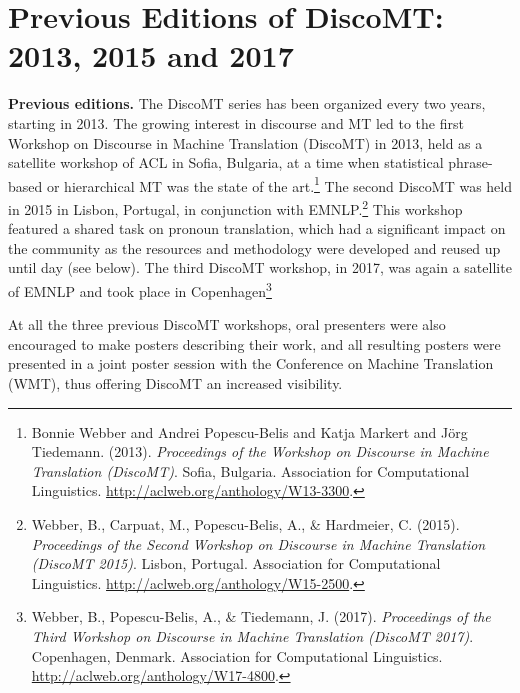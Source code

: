 \documentclass[11pt]{article}
\begin{document}
\section{Previous Editions of DiscoMT: 2013, 2015 and 2017}


\textbf{Previous editions.}  The DiscoMT series has been organized every two years, starting in 2013.  The growing interest in discourse and MT led to the first Workshop on Discourse in Machine Translation (DiscoMT) in 2013, held as a satellite workshop of ACL in Sofia, Bulgaria, at a time when statistical phrase-based or hierarchical MT was the state of the art.\footnote{Bonnie Webber  and  Andrei Popescu-Belis  and  Katja Markert  and  J\"{o}rg Tiedemann. (2013). \textit{Proceedings of the Workshop on Discourse in Machine Translation (DiscoMT)}. Sofia, Bulgaria. Association for Computational Linguistics. \url{http://aclweb.org/anthology/W13-3300}.} 
The second DiscoMT was held in 2015 in Lisbon, Portugal, in conjunction with EMNLP.\footnote{Webber, B., Carpuat, M., Popescu-Belis, A., \& Hardmeier, C. (2015). \textit{Proceedings of the Second Workshop on Discourse in Machine Translation (DiscoMT 2015)}. Lisbon, Portugal. Association for Computational Linguistics.  \url{http://aclweb.org/anthology/W15-2500}.}  This workshop featured a shared task on pronoun translation, which had a significant impact on the community as the resources and methodology were developed and reused up until day (see below).
The third DiscoMT workshop, in 2017, was again a satellite of EMNLP and took place in Copenhagen\footnote{Webber, B., Popescu-Belis, A., \& Tiedemann, J. (2017). \textit{Proceedings of the Third Workshop on Discourse in Machine Translation (DiscoMT 2017)}. Copenhagen, Denmark. Association for Computational Linguistics.  \url{http://aclweb.org/anthology/W17-4800}.}

At all the three previous DiscoMT workshops, oral presenters were also encouraged to make posters
describing their work, and all resulting posters were presented in a joint
poster session with the Conference on Machine Translation (WMT), thus offering DiscoMT an increased visibility.
\end{document}
